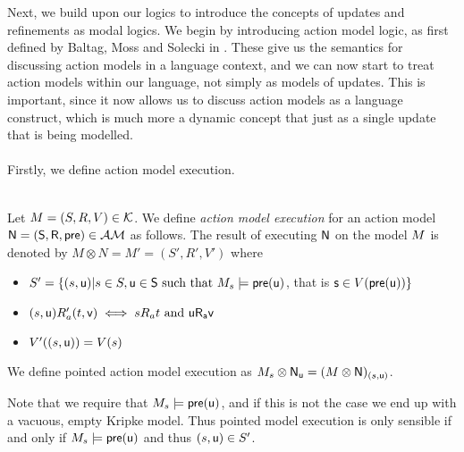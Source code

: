 Next, we build upon our logics to introduce the concepts of updates and refinements as modal logics.
We begin by introducing action model logic, as first defined by Baltag, Moss and Solecki in
\cite{baltag1998lpa}.
These give us the semantics for discussing action models in a language context, and we can now start
to treat action models within our language, not simply as models of updates.
This is important, since it now allows us to discuss action models as a language construct, which is
much more a dynamic concept that just as a single update that is being modelled.\\
\\
Firstly, we define action model execution.\\
\\
\begin{defn} \label{evModelEx}
	Let $M = (S, R, V) \in \mathcal{K}$. We define {\em action model
	execution} for an action model $\mathrm{\mathsf{\mathrm{\mathsf{N}} = (S,
		R, pre)}} \in
\mathcal{AM}$ as follows.
The result of executing $\mathrm{\mathsf{N}}$ on the model $M$ is denoted by $M \otimes N = M' = (S', R', V')$ where
\begin{itemize}
	\item $S' = \{(s,\mathrm{\mathsf{u}}) | s \in S, \mathrm{\mathsf{u \in
		S}} \text{ such that } M_s \models \mathrm{\mathsf{pre(u)}}$, that is $\mathrm{\mathsf{s}} \in V(\mathrm{\mathsf{pre}}(\mathrm{\mathsf{u}}))\}$
	\item $(s, \mathrm{\mathsf{u}}) R_a' (t, \mathrm{\mathsf{v}}) \iff s R_a t \text{ and } \mathrm{\mathsf{u R_a v}}$
	\item $V'((s,\mathrm{\mathsf{u}})) = V(s)$
\end{itemize}
We define pointed action model execution as $M_s \otimes
\mathrm{\mathsf{\mathrm{\mathsf{N}}_u}}
= (M \otimes \mathrm{\mathsf{\mathrm{\mathsf{N}}}})_{(s, \mathrm{\mathsf{u}})}$.
\end{defn}

Note that we require that $M_s \models \mathrm{\mathsf{pre(u)}}$, and if this is not the case we end up with a
vacuous, empty Kripke model.
Thus pointed model execution is only sensible if and only if $M_s \models
\mathrm{\mathsf{pre(u)}}$ and thus $(s,\mathrm{\mathsf{u}})
	\in S'$.

